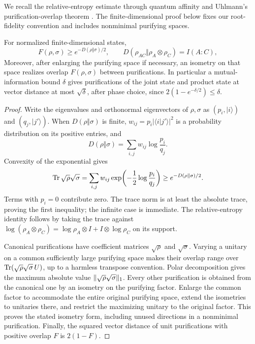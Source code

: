 We recall the relative-entropy estimate through quantum affinity
\cite[Equation~(2.9)]{CarlenLieb2014} and Uhlmann's purification-overlap
theorem \cite[Sections~2 and~5]{Uhlmann1976}. The finite-dimensional proof
below fixes our root-fidelity convention and includes nonminimal purifying
spaces.

\begin{lemma}\label{lem:fidelity}
For normalized finite-dimensional states,
\begin{equation}\label{eq:fidelity-information}
 F(\rho,\sigma)\ge e^{-D(\rho\Vert\sigma)/2},
 \qquad
 D(\rho_{AC}\Vert\rho_A\otimes\rho_C)=I(A:C),
\end{equation}
Moreover, after enlarging the
purifying space if necessary, an isometry on that space realizes overlap
$F(\rho,\sigma)$ between purifications. In particular a
mutual-information bound $\delta$ gives purifications of the joint state
and product state at vector distance at most $\sqrt\delta$, after phase
choice, since $2(1-e^{-\delta/2})\le\delta$.
\end{lemma}
\begin{proof}
Write the eigenvalues and orthonormal eigenvectors of $\rho,\sigma$ as
$(p_i,|i\rangle)$ and $(q_j,|j'\rangle)$. When $D(\rho\Vert\sigma)$ is
finite, $w_{ij}=p_i|\langle i|j'\rangle|^2$ is a probability distribution
on its positive entries, and
\[
 D(\rho\Vert\sigma)=\sum_{i,j}w_{ij}\log\frac{p_i}{q_j}.
\]
Convexity of the exponential gives
\[
 \operatorname{Tr}\sqrt\rho\sqrt\sigma
 =\sum_{i,j}w_{ij}\exp\!\left(-\frac12\log\frac{p_i}{q_j}\right)
 \ge e^{-D(\rho\Vert\sigma)/2}.
\]
Terms with $p_i=0$ contribute zero. The trace norm is at least the
absolute trace, proving the first inequality; the infinite case is
immediate. The relative-entropy identity follows by taking the trace
against $\log(\rho_A\otimes\rho_C)
=\log\rho_A\otimes I+I\otimes\log\rho_C$ on its support.

Canonical purifications have coefficient matrices $\sqrt\rho$ and
$\sqrt\sigma$. Varying a unitary on a common sufficiently large
purifying space makes their overlap range over
$\operatorname{Tr}(\sqrt\rho\sqrt\sigma\,U)$, up to a harmless transpose convention.
Polar decomposition gives the maximum absolute value
$\lVert \sqrt\rho\sqrt\sigma\rVert_1$. Every other purification is obtained
from the canonical one by an isometry on the purifying factor. Enlarge
the common factor to accommodate the entire original purifying space,
extend the isometries to unitaries there, and restrict the maximizing
unitary to the original factor. This proves the stated isometry form,
including unused directions in a nonminimal purification. Finally,
the squared vector distance of unit purifications with positive overlap
$F$ is $2(1-F)$.
\end{proof}


